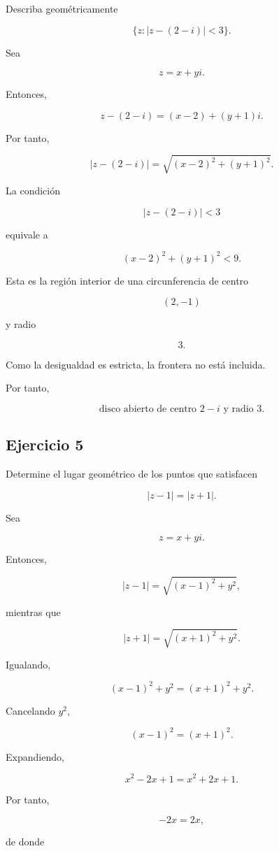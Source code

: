 \documentclass[12pt]{article}
\begin{document}
Describa geométricamente

\[
\{z:|z-(2-i)|<3\}.
\]

Sea

\[
z=x+yi.
\]

Entonces,

\[
z-(2-i)
=
(x-2)+(y+1)i.
\]

Por tanto,

\[
|z-(2-i)|
=
\sqrt{(x-2)^2+(y+1)^2}.
\]

La condición

\[
|z-(2-i)|<3
\]

equivale a

\[
(x-2)^2+(y+1)^2<9.
\]

Esta es la región interior de una circunferencia de centro

\[
(2,-1)
\]

y radio

\[
3.
\]

Como la desigualdad es estricta, la frontera no está incluida.

Por tanto,

\[
\boxed{
\text{disco abierto de centro }2-i\text{ y radio }3
}.
\]


\subsection*{Ejercicio 5}

Determine el lugar geométrico de los puntos que satisfacen

\[
|z-1|=|z+1|.
\]

Sea

\[
z=x+yi.
\]

Entonces,

\[
|z-1|
=
\sqrt{(x-1)^2+y^2},
\]

mientras que

\[
|z+1|
=
\sqrt{(x+1)^2+y^2}.
\]

Igualando,

\[
(x-1)^2+y^2=(x+1)^2+y^2.
\]

Cancelando \(y^2\),

\[
(x-1)^2=(x+1)^2.
\]

Expandiendo,

\[
x^2-2x+1=x^2+2x+1.
\]

Por tanto,

\[
-2x=2x,
\]

de donde
\end{document}
